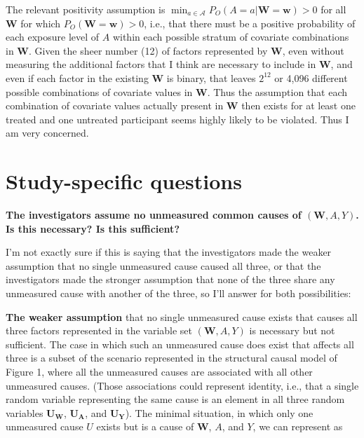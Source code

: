 \documentclass{article}\usepackage[]{graphicx}\usepackage[]{xcolor}
\begin{document}
\begin{enumerate}[label=\textbf{\arabic*.}]
The relevant positivity assumption is $\min_{a \in \mathcal{A}}P_O(A=a|\bm{W}=\bm{w})>0$ for all $\bm{W}$ for which $P_O(\bm{W}=\bm{w})>0$, i.e., that there must be a positive probability of each exposure level of $A$ within each possible stratum of covariate combinations in $\bm{W}$. Given the sheer number (12) of factors represented by $\bm{W}$, even without measuring the additional factors that I think are necessary to include in $\bm{W}$, and even if each factor in the existing $\bm{W}$ is binary, that leaves $2^12$ or 4,096 different possible combinations of covariate values in $\bm{W}$. Thus the assumption that each combination of covariate values actually present in $\bm{W}$ then exists for at least one treated and one untreated participant seems highly likely to be violated. Thus I am very concerned.

\end{enumerate}

\setlength{\leftskip}{0cm}

\section{Study-specific questions}

\setlength{\leftskip}{0.8cm}

\textbf{The investigators assume no unmeasured common causes of $(\bm{W}, A, Y)$. Is this necessary? Is this sufficient?} 

I'm not exactly sure if this is saying that the investigators made the weaker assumption that no single unmeasured cause caused all three, or that the investigators made the stronger assumption that none of the three share any unmeasured cause with another of the three, so I'll answer for both possibilities:

\vspace{2mm}

\textbf{The weaker assumption} that no single unmeasured cause exists that causes all three factors represented in the variable set $(\bm{W}, A, Y)$ is necessary but not sufficient. The case in which such an unmeasured cause does exist that affects all three is a subset of the scenario represented in the structural causal model of Figure 1, where all the unmeasured causes are associated with all other unmeasured causes. (Those associations could represent identity, i.e., that a single random variable representing the same cause is an element in all three random variables $\bm{U_W}$, $\bm{U_A}$, and $\bm{U_Y}$). The minimal situation, in which only one unmeasured cause $U$ exists but is a cause of $\bm{W}$, $A$, and $Y$, we can represent as
\end{document}
